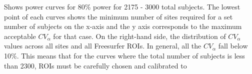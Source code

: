 \label{fig:cv_j} Shows power curves for 80\% power for 2175 - 3000 total subjects. The lowest point of each curves shows the minimum number of sites required for a set number of subjects on the x-axis and the y axis corresponds to the maximum acceptable $CV_{\alpha}$ for that case. On the right-hand side, the distribution of $CV_{\alpha}$ values across all sites and all Freesurfer ROIs. In general, all the $CV_{\alpha}$ fall below 10\%. This means that for the curves where the total number of subjects is less than 2300, ROIs must be carefully chosen and calibrated to 